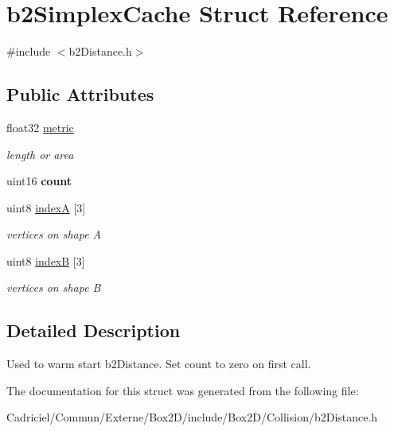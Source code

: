 \hypertarget{structb2_simplex_cache}{}\section{b2\+Simplex\+Cache Struct Reference}
\label{structb2_simplex_cache}


{\ttfamily \#include $<$b2\+Distance.\+h$>$}

\subsection*{Public Attributes}
\begin{DoxyCompactItemize}
\item 
float32 \hyperlink{structb2_simplex_cache_a018e0a500b417d79bfed3f21310b15a2}{metric}\hypertarget{structb2_simplex_cache_a018e0a500b417d79bfed3f21310b15a2}{}\label{structb2_simplex_cache_a018e0a500b417d79bfed3f21310b15a2}

\begin{DoxyCompactList}\small\item\em length or area \end{DoxyCompactList}\item 
uint16 {\bfseries count}\hypertarget{structb2_simplex_cache_a5ef63839988cc06210ae76bcef96f56c}{}\label{structb2_simplex_cache_a5ef63839988cc06210ae76bcef96f56c}

\item 
uint8 \hyperlink{structb2_simplex_cache_ab574159e69dda7e14ead8de848ca6b67}{indexA} \mbox{[}3\mbox{]}\hypertarget{structb2_simplex_cache_ab574159e69dda7e14ead8de848ca6b67}{}\label{structb2_simplex_cache_ab574159e69dda7e14ead8de848ca6b67}

\begin{DoxyCompactList}\small\item\em vertices on shape A \end{DoxyCompactList}\item 
uint8 \hyperlink{structb2_simplex_cache_ab7586465ee2c5f7c3bdd8f80d5e256a7}{indexB} \mbox{[}3\mbox{]}\hypertarget{structb2_simplex_cache_ab7586465ee2c5f7c3bdd8f80d5e256a7}{}\label{structb2_simplex_cache_ab7586465ee2c5f7c3bdd8f80d5e256a7}

\begin{DoxyCompactList}\small\item\em vertices on shape B \end{DoxyCompactList}\end{DoxyCompactItemize}


\subsection{Detailed Description}
Used to warm start b2\+Distance. Set count to zero on first call. 

The documentation for this struct was generated from the following file\+:\begin{DoxyCompactItemize}
\item 
Cadriciel/\+Commun/\+Externe/\+Box2\+D/include/\+Box2\+D/\+Collision/b2\+Distance.\+h\end{DoxyCompactItemize}
